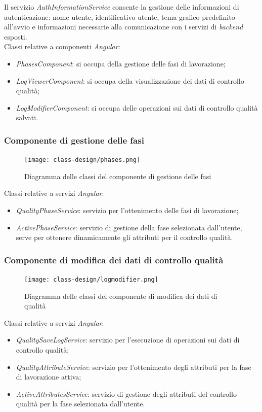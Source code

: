 Il servizio \textit{AuthInformationService} consente la gestione delle informazioni di autenticazione: nome utente, identificativo utente, tema grafico predefinito all'avvio e informazioni necessarie alla comunicazione con i servizi di \textit{backend} esposti.\\
Classi relative a componenti \textit{Angular}:
\begin{itemize}
    \item \textit{PhasesComponent}: si occupa della gestione delle fasi di lavorazione;
    \item \textit{LogViewerComponent}: si occupa della visualizzazione dei dati di controllo qualità;
    \item \textit{LogModifierComponent}: si occupa delle operazioni sui dati di controllo qualità salvati.
\end{itemize}

\subsubsection*{Componente di gestione delle fasi}
\begin{figure}[H]
    \centering
    \texttt{[image: class-design/phases.png]}
    \caption{Diagramma delle classi del componente di gestione delle fasi}
\end{figure}
Classi relative a servizi \textit{Angular}:
\begin{itemize}
    \item \textit{QualityPhaseService}: servizio per l'ottenimento delle fasi di lavorazione;
    \item \textit{ActivePhaseService}: servizio di gestione della fase selezionata dall'utente, serve per ottenere dinamicamente gli attributi per il controllo qualità.
\end{itemize}

\subsubsection*{Componente di modifica dei dati di controllo qualità}
\begin{figure}[H]
    \centering
    \texttt{[image: class-design/logmodifier.png]}
    \caption{Diagramma delle classi del componente di modifica dei dati di qualità}
\end{figure}
Classi relative a servizi \textit{Angular}:
\begin{itemize}
    \item \textit{QualitySaveLogService}: servizio per l'esecuzione di operazioni sui dati di controllo qualità;
    \item \textit{QualityAttributeService}: servizio per l'ottenimento degli attributi per la fase di lavorazione attiva;
    \item \textit{ActiveAttributesService}: servizio di gestione degli attributi del controllo qualità per la fase selezionata dall'utente.
\end{itemize}


